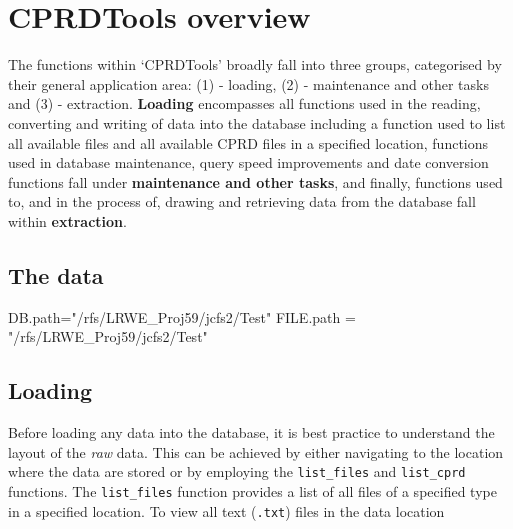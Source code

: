 \documentclass[
]{article}
\newenvironment{Shaded}{\begin{snugshade}}{\end{snugshade}}
\newcommand{\AttributeTok}[1]{\textcolor[rgb]{0.77,0.63,0.00}{#1}}
\newcommand{\CommentTok}[1]{\textcolor[rgb]{0.56,0.35,0.01}{\textit{#1}}}
\newcommand{\FunctionTok}[1]{\textcolor[rgb]{0.00,0.00,0.00}{#1}}
\newcommand{\NormalTok}[1]{#1}
\newcommand{\OtherTok}[1]{\textcolor[rgb]{0.56,0.35,0.01}{#1}}
\newcommand{\StringTok}[1]{\textcolor[rgb]{0.31,0.60,0.02}{#1}}
\begin{document}
\hypertarget{cprdtools-overview}{%
\section{CPRDTools overview}\label{cprdtools-overview}}

The functions within `CPRDTools' broadly fall into three groups,
categorised by their general application area: (1) - loading, (2) -
maintenance and other tasks and (3) - extraction. \textbf{Loading}
encompasses all functions used in the reading, converting and writing of
data into the database including a function used to list all available
files and all available CPRD files in a specified location, functions
used in database maintenance, query speed improvements and date
conversion functions fall under \textbf{maintenance and other tasks},
and finally, functions used to, and in the process of, drawing and
retrieving data from the database fall within \textbf{extraction}.

\hypertarget{the-data}{%
\subsection{The data}\label{the-data}}

\begin{Shaded}
\begin{Highlighting}[]
\NormalTok{DB.path}\OtherTok{=}\StringTok{"/rfs/LRWE\_Proj59/jcfs2/Test"}
\NormalTok{FILE.path }\OtherTok{=} \StringTok{"/rfs/LRWE\_Proj59/jcfs2/Test"}
\end{Highlighting}
\end{Shaded}

\hypertarget{loading}{%
\subsection{Loading}\label{loading}}

Before loading any data into the database, it is best practice to
understand the layout of the \emph{raw} data. This can be achieved by
either navigating to the location where the data are stored or by
employing the \texttt{list\_files} and \texttt{list\_cprd} functions.
The \texttt{list\_files} function provides a list of all files of a
specified type in a specified location. To view all text (\texttt{.txt})
files in the data location

\begin{Shaded}
\end{Shaded}
\end{document}
